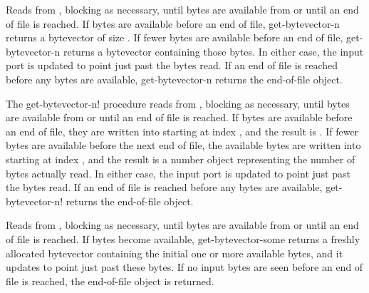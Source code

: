 \begin{entry}{%
}
   

Reads from , blocking as necessary, until 
bytes are available from  or until an end of file is
reached. If  bytes are available before an end
of file, {\cf get-bytevector-n} returns a bytevector of size .
If fewer bytes are available before an end of file, {\cf get-bytevector-n}
returns a bytevector
containing those bytes. In either case, the input port is updated to
point just past the bytes read.  If an end of file is reached before
any bytes are available, {\cf get-bytevector-n} returns the end-of-file object.
\end{entry}

\begin{entry}{%
}

   
The {\cf get-bytevector-n!} procedure reads from ,
blocking as necessary, until
 bytes are available from  or until
an end of file is
reached. If  bytes are available before an end of file,
they are written into  starting at index , and
the result is . If fewer bytes are available before
the next end of file, the available bytes are written into 
starting at index , and the result is a number object
representing the number of bytes actually
read. In either case, the input port is updated to point just past the
bytes read. If an end of file is reached before any bytes
are available, {\cf get-bytevector-n!} returns the end-of-file object.
\end{entry}

\begin{entry}{%
}
   
Reads from , blocking as necessary, until bytes are
available from  or until an end of file is reached.
If bytes become available,
{\cf get-bytevector-some} returns a freshly allocated
bytevector containing the initial one or more available bytes,
and it updates  to point just past these bytes.
If no input bytes are seen before an end
of file is reached, the end-of-file object is returned.
\end{entry}

